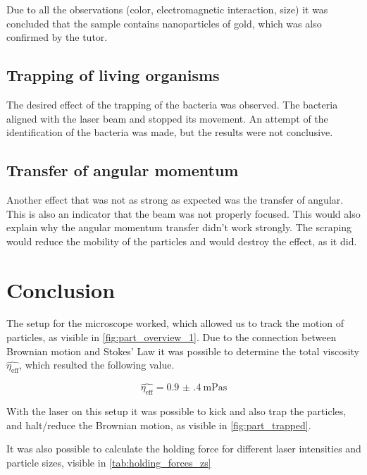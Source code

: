 \documentclass[12pt,english]{scrartcl}
\begin{document}
Due to all the observations (color, electromagnetic interaction, size) it was
concluded that the sample contains nanoparticles of gold, which was also
confirmed by the tutor.

\subsection{Trapping of living organisms}

The desired effect of the trapping of the bacteria was observed. The bacteria
aligned with the laser beam and stopped its movement. An attempt of the
identification of the bacteria was made, but the results were not conclusive.

\subsection{Transfer of angular momentum}

Another effect that was not as strong as expected was the transfer of angular.
This is also an indicator that the beam was not properly focused. This would
also explain why the angular momentum transfer didn't work strongly. The
scraping would reduce the mobility of the particles and would destroy the
effect, as it did.

\newpage
\section{Conclusion}\label{sec:zusammenfassung}

The setup for the microscope worked, which allowed us to track the motion of
particles, as visible in \autoref{fig:part_overview_1}. Due to the connection
between Brownian motion and Stokes' Law it was possible to determine the total
viscosity $\hat{\eta_\text{eff}}$, which resulted the following value.

\begin{equation*}
	\hat{\eta_\text{eff}} = \SI{0.9(4)}{\milli\pascal\second}
\end{equation*}

With the laser on this setup it was possible to kick and also trap the
particles, and halt/reduce the Brownian motion, as visible in
\autoref{fig:part_trapped}.

It was also possible to calculate the holding force for different laser
intensities and particle sizes, visible in \autoref{tab:holding_forces_zs}
\end{document}
